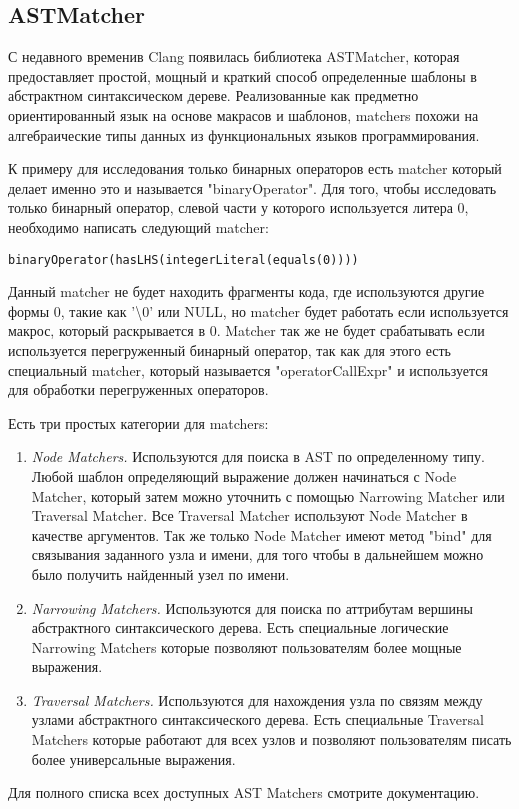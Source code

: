\subsection*{ASTMatcher}
С недавного временив Clang появилась библиотека ASTMatcher, которая предоставляет простой, мощный и
краткий способ определенные шаблоны в абстрактном синтаксическом дереве. Реализованные как
предметно ориентированный язык на основе макрасов и шаблонов, matchers похожи на алгебраические 
типы данных из функциональных языков программирования.

К примеру для исследования только бинарных операторов есть matcher который делает именно это и называется 
"binaryOperator". Для того, чтобы исследовать только бинарный оператор, слевой части у которого 
используется литера 0, необходимо написать следующий matcher: 
\begin{lstlisting}
binaryOperator(hasLHS(integerLiteral(equals(0))))
\end{lstlisting}
Данный matcher не будет находить фрагменты кода, где используются другие формы 0, такие как '\textbackslash0' или NULL,
но matcher будет работать если используется макрос, который раскрывается в 0. Matcher так же 
не будет срабатывать если используется перегруженный бинарный оператор, так как для этого 
есть специальный matcher, который называется "operatorCallExpr" и используется для обработки 
перегруженных операторов. 

Есть три простых категории для matchers:
\begin{enumerate}
	\item \textit{Node Matchers.} Используются для поиска в AST по определенному типу. Любой шаблон
определяющий выражение должен начинаться с Node Matcher, который затем можно уточнить с помощью
Narrowing Matcher или Traversal Matcher. Все Traversal Matcher используют Node Matcher в качестве аргументов.
Так же только Node Matcher имеют метод "bind" для связывания заданного узла и имени, для того чтобы в дальнейшем
можно было получить найденный узел по имени.
	\item \textit{Narrowing Matchers.} Используются для поиска по аттрибутам вершины абстрактного
синтаксического дерева. Есть специальные логические Narrowing Matchers которые позволяют 
пользователям более мощные выражения. 
	\item \textit{Traversal Matchers.} Используются для нахождения узла по связям между узлами 
абстрактного синтаксического дерева. Есть специальные Traversal Matchers которые работают для 
всех узлов и позволяют пользователям писать более универсальные выражения.
\end{enumerate}
Для полного списка всех доступных AST Matchers смотрите документацию.

